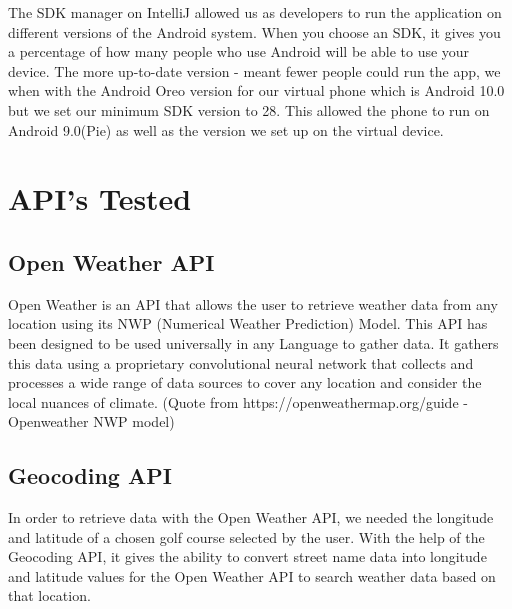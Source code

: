 The SDK manager on IntelliJ allowed us as developers to run the application on different versions of the Android system. When you choose an SDK, it gives you a percentage of how many people who use Android will be able to use your device. The more up-to-date version - meant fewer people could run the app, we when with the Android Oreo version for our virtual phone which is Android 10.0 but we set our minimum SDK version to 28. This allowed the phone to run on Android 9.0(Pie) as well as the version we set up on the virtual device.
\section{API's Tested}

\subsection{Open Weather API}
Open Weather is an API that allows the user to retrieve weather data from any location using its NWP (Numerical Weather Prediction) Model. This API has been designed to be used universally in any Language to gather data. It gathers this data using a proprietary convolutional neural network that collects and processes a wide range of data sources to cover any location and
consider the local nuances of climate.
(Quote from https://openweathermap.org/guide - Openweather NWP model)

\subsection{Geocoding API}
In order to retrieve data with the Open Weather API, we needed the longitude and latitude of a chosen golf course selected by the user. With the help of the Geocoding API, it gives the ability to convert street name data into longitude and latitude values for the Open Weather API to search weather data based on that location.

